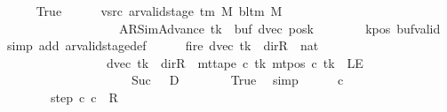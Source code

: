 \begin{isabellebody}
\ \ \ \ \isamarkupfalse%
\ True\isanewline
\ \ \ \ \isamarkupfalse%
\ vsrc{}{\isacharcolon}{\kern0pt}\ {\isachardoublequoteopen}ar{\isacharunderscore}{\kern0pt}valid{\isacharunderscore}{\kern0pt}stage\ {\isacharparenleft}{\kern0pt}{\isasymGamma}{\isacharunderscore}{\kern0pt}tm\ M{\isacharparenright}{\kern0pt}\ {\isacharparenleft}{\kern0pt}bl{\isacharunderscore}{\kern0pt}tm\ M{\isacharparenright}{\kern0pt}\isanewline
\ \ \ \ \ \ \ \ \ \ \ \ \ \ \ \ \ \ \ {\isacharparenleft}{\kern0pt}AR{\isacharunderscore}{\kern0pt}SimAdvance{\isacharcomma}{\kern0pt}\ tk{\isacharcomma}{\kern0pt}\ {}{\isacharcomma}{\kern0pt}\ buf{\isacharcomma}{\kern0pt}\ dvec{\isacharcomma}{\kern0pt}\ posk{\isacharparenright}{\kern0pt}{\isachardoublequoteclose}\isanewline
\ \ \ \ \ \ \isamarkupfalse%
\ kpos\ buf{\isacharunderscore}{\kern0pt}valid\ \isamarkupfalse%
\ {\isacharparenleft}{\kern0pt}simp\ add{\isacharcolon}{\kern0pt}\ ar{\isacharunderscore}{\kern0pt}valid{\isacharunderscore}{\kern0pt}stage{\isacharunderscore}{\kern0pt}def{\isacharparenright}{\kern0pt}\isanewline
\ \ \ \ \isamarkupfalse%
\ fire{\isacharcolon}{\kern0pt}\ {\isachardoublequoteopen}{\isacharparenleft}{\kern0pt}dvec\ tk\ {\isacharequal}{\kern0pt}\ dir{\isachardot}{\kern0pt}R\ {\isasymand}\ {\isacharparenleft}{\kern0pt}{}{\isacharcolon}{\kern0pt}{\isacharcolon}{\kern0pt}nat{\isacharparenright}{\kern0pt}\ {\isacharequal}{\kern0pt}\ {}{\isacharparenright}{\kern0pt}\isanewline
\ \ \ \ \ \ \ \ \ \ \ \ \ \ \ \ {\isasymor}\ {\isacharparenleft}{\kern0pt}dvec\ tk\ {\isasymnoteq}\ dir{\isachardot}{\kern0pt}R\ {\isasymand}\ mt{\isacharunderscore}{\kern0pt}tape\ c{}\ tk\ {\isacharparenleft}{\kern0pt}mt{\isacharunderscore}{\kern0pt}pos\ c{}\ tk{\isacharparenright}{\kern0pt}\ {\isasymnoteq}\ LE{}\isanewline
\ \ \ \ \ \ \ \ \ \ \ \ \ \ \ \ \ \ \ \ {\isasymand}\ Suc\ {}\ {\isacharequal}{\kern0pt}\ {\isacharquery}{\kern0pt}D{\isacharparenright}{\kern0pt}{\isachardoublequoteclose}\isanewline
\ \ \ \ \ \ \isamarkupfalse%
\ True\ \isamarkupfalse%
\ simp\isanewline
\ \ \ \ \isamarkupfalse%
\ c{\isacharprime}{\kern0pt}\ \isanewline
\ \ \ \ \ \ \ \ step{\isacharcolon}{\kern0pt}\ {\isachardoublequoteopen}{\isacharparenleft}{\kern0pt}c{}{\isacharcomma}{\kern0pt}\ c{\isacharprime}{\kern0pt}{\isacharparenright}{\kern0pt}\ {\isasymin}\ {\isacharquery}{\kern0pt}R{\isachardoublequoteclose}\isanewline

\end{isabellebody}
